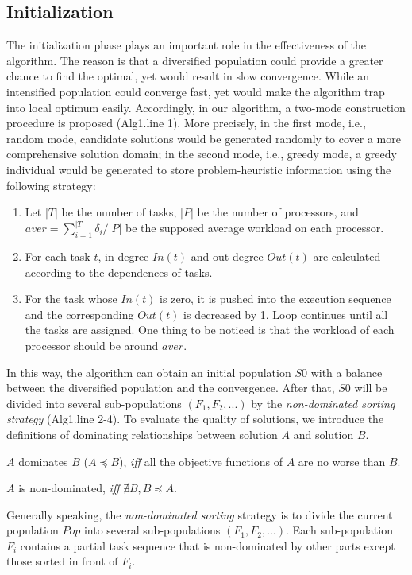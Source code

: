 \subsection{Initialization}
The initialization phase plays an important role in the effectiveness of the algorithm. The reason is that a diversified population could provide a greater chance to find the optimal, yet would result in slow convergence. While an intensified population could converge fast, yet would make the algorithm trap into local optimum easily. Accordingly, in our algorithm, a two-mode construction procedure is proposed (Alg1.line 1). More precisely, in the first mode, i.e., random mode, candidate solutions would be generated randomly to cover a more comprehensive solution domain; in the second mode, i.e., greedy mode, a greedy individual would be generated to store problem-heuristic information using the following strategy:
\begin{enumerate}

\item Let $|T|$ be the number of tasks, $|P|$ be the number of processors,  and $aver=\sum^{|T|}_{i=1}\delta_i/|P|$ be the supposed average workload on each processor.
\item For each task $t$,  in-degree $In(t)$ and out-degree $Out(t)$ are calculated according to the dependences of tasks.
\item For the task whose $In(t)$ is zero, it is pushed into the execution sequence and the corresponding $Out(t)$ is decreased by 1. Loop continues until all the tasks are assigned. One thing to be noticed is that the workload of each processor should be around $aver$.
\end{enumerate}

In this way, the algorithm can obtain an initial population $S0$ with a balance between the diversified population and the convergence. After that, $S0$ will be divided into several sub-populations $(F_1,F_2,...)$ by the \textit{non-dominated sorting strategy} (Alg1.line 2-4). To evaluate the quality of solutions, we introduce the definitions of dominating relationships between solution $A$ and solution $B$.

\begin{defi}
 $A$ dominates $B$ ($ A \preceq B$), \textit{iff} all the objective functions of $A$ are no worse than $B$.
\end{defi}
\begin{defi} $A$ is non-dominated, \textit{iff} {$ \nexists B, B\preceq A $}.
\end{defi}
Generally speaking, the \textit{non-dominated sorting} strategy is to divide the current population $Pop$ into several sub-populations $(F_1,F_2,...)$. Each sub-population $F_i$ contains a partial task sequence that is non-dominated by other parts except those  sorted in front of $F_i$.

